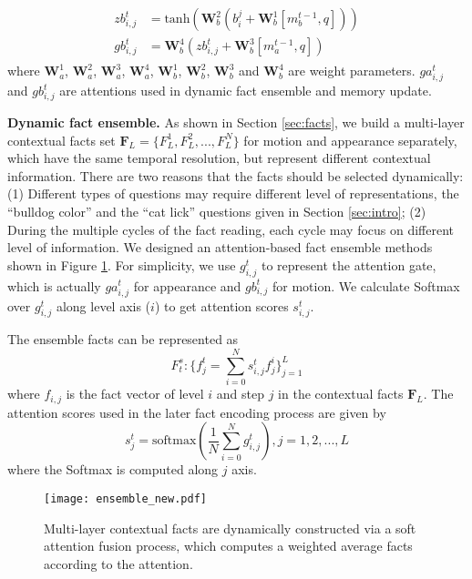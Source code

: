 \documentclass[10pt,twocolumn,letterpaper]{article}
\begin{document}
\begin{align}
\begin{split}
    zb_{i,j}^t&=\mbox{tanh}\left (\mathbf W_b^2 \left ( b^j_i+\mathbf W_b^1 [m_b^{t-1},q] \right ) \right ) \\
    gb_{i,j}^t&=\mathbf W_b^4 \left ( zb_{i,j}^t+\mathbf W_b^3 [m_a^{t-1}, q] \right )
\end{split}
\end{align} 
where $\mathbf W_a^1$, $\mathbf W_a^2$, $\mathbf W_a^3$, $\mathbf W_a^4$, $\mathbf W_b^1$, $\mathbf W_b^2$, $\mathbf W_b^3$ and $\mathbf W_b^4$ are weight parameters. $ga_{i,j}^t$ and $gb_{i,j}^t$ are attentions used in dynamic fact ensemble and memory update.


\textbf{Dynamic fact ensemble.}
As shown in Section \ref{sec:facts}, we build a multi-layer contextual facts set $\mathbf F_L=\{F^1_{L}, F^2_{L},..., F^N_{L}\}$ for motion and appearance separately, which have the same temporal resolution, but represent different contextual information. There are two reasons that the facts should be selected dynamically: (1) Different types of questions may require different level of representations, \eg the ``bulldog color'' and the ``cat lick'' questions given in Section \ref{sec:intro}; (2) During the multiple cycles of the fact reading, each cycle may focus on different level of information. We designed an attention-based fact ensemble methods shown in Figure \ref{fig:ensemble}. For simplicity, we use $g_{i,j}^t$ to represent the attention gate, which is actually $ga_{i,j}^t$ for appearance and $gb_{i,j}^t$ for motion. We calculate Softmax over $g_{i,j}^t$ along level axis (\ie $i$)  to get attention scores $s_{i,j}^t$. 



The ensemble facts can be represented as  
\begin{equation}
    F_{t}^s:\{f_{j}^t=\sum_{i=0}^N s_{i,j}^t f_{j}^i\}_{j=1}^L 
\end{equation} 
where $f_{i,j}$ is the fact vector of level $i$ and step $j$ in the contextual facts $\mathbf F_L$. The attention scores used in the later fact encoding process are given by
\begin{equation}
    s_{j}^t=\mbox{softmax}(\frac{1}{N}\sum_{i=0}^N g_{i,j}^t), j=1,2,...,L
\end{equation}
where the Softmax is computed along $j$ axis.
 
\begin{figure}[]
  \centering
    \texttt{[image: ensemble\_new.pdf]}
    \caption{Multi-layer contextual facts are dynamically constructed via a soft attention fusion process, which computes a weighted average facts according to the attention. }
      \label{fig:ensemble}
\end{figure}
\end{document}
